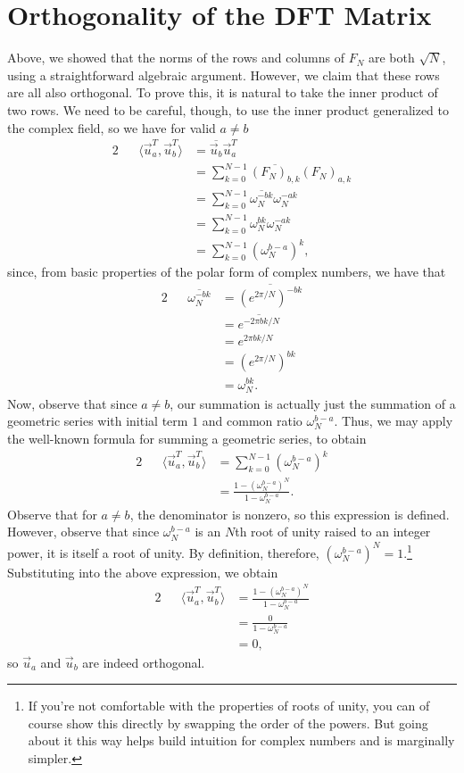 \documentclass[letterpaper]{article}
\theoremstyle{remark}
\newcommand{\eqn}[1]{\begin{alignat*}{2}#1\end{alignat*}}
\begin{document}
\section{Orthogonality of the DFT Matrix}
Above, we showed that the norms of the rows and columns of $F_N$ are both $\sqrt{N}$, using a straightforward algebraic argument. However, we claim that these rows are all also orthogonal. To prove this, it is natural to take the inner product of two rows. We need to be careful, though, to use the inner product generalized to the complex field, so we have for valid $a \ne b$
\eqn{
    && \langle \vec{u}_a^T, \vec{u}_b^T \rangle &= \overline{\vec{u}_b} \vec{u}_a^T \\
    &&&= \sum_{k=0}^{N-1} \overline{(F_N)_{b, k}} (F_N)_{a, k} \\
    &&&= \sum_{k=0}^{N-1} \overline{\omega_N^{-bk}}\omega_N^{-ak} \\
    &&&= \sum_{k=0}^{N-1} \omega_N^{bk}\omega_N^{-ak} \\
    &&&= \sum_{k=0}^{N-1} (\omega_N^{b-a})^k,
}
since, from basic properties of the polar form of complex numbers, we have that
\eqn{
    && \overline{\omega_N^{-bk}} &= \overline{(e^{2\pi / N})^{-bk}} \\
    &&&= \overline{e^{-2\pi b k / N}} \\
    &&&= e^{2 \pi b k / N} \\
    &&&= (e^{2 \pi / N})^{bk} \\
    &&&= \omega_N^{bk}.
}
Now, observe that since $a \ne b$, our summation is actually just the summation of a geometric series with initial term $1$ and common ratio $\omega_N^{b-a}$. Thus, we may apply the well-known formula for summing a geometric series, to obtain
\eqn{
    && \langle \vec{u}_a^T, \vec{u}_b^T \rangle &= \sum_{k=0}^{N-1} (\omega_N^{b-a})^k \\
    &&&= \frac{1 - (\omega_N^{b-a})^N}{1 - \omega_N^{b-a}}.
}
Observe that for $a \ne b$, the denominator is nonzero, so this expression is defined. However, observe that since $\omega_N^{b-a}$ is an $N$th root of unity raised to an integer power, it is itself a root of unity. By definition, therefore, $(\omega_N^{b-a})^N = 1$.\footnote{If you're not comfortable with the properties of roots of unity, you can of course show this directly by swapping the order of the powers. But going about it this way helps build intuition for complex numbers and is marginally simpler.} Substituting into the above expression, we obtain
\eqn{
    && \langle \vec{u}_a^T, \vec{u}_b^T \rangle &= \frac{1 - (\omega_N^{b-a})^N}{1 - \omega_N^{b-a}} \\
    &&&= \frac{0}{1 - \omega_N^{b-a}} \\
    &&&= 0,
}
so $\vec{u}_a$ and $\vec{u}_b$ are indeed orthogonal.
\end{document}
